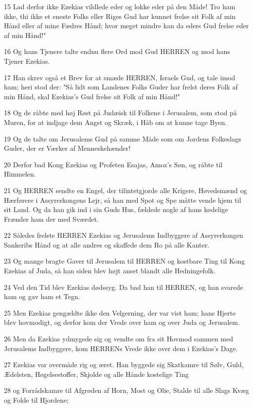\par 15 Lad derfor ikke Ezekias vildlede eder og lokke eder på den Måde! Tro ham ikke, thi ikke et eneste Folks eller Riges Gud har kunnet frelse sit Folk af min Hånd eller af mine Fædres Hånd; hvor meget mindre kan da eders Gud frelse eder af min Hånd!"
\par 16 Og hans Tjenere talte endnu flere Ord mod Gud HERREN og mod hans Tjener Ezekias.
\par 17 Han skrev også et Brev for at smæde HERREN, Israels Gud, og tale imod ham; heri stod der: "Så lidt som Landenes Folks Guder har frelst deres Folk af min Hånd, skal Ezekias's Gud frelse sit Folk af min Hånd!"
\par 18 Og de råbte med høj Røst på Judæisk til Folkene i Jerusalem, som stod på Muren, for at indjage dem Angst og Skræk, i Håb om at kunne tage Byen.
\par 19 Og de talte om Jerusalems Gud på samme Måde som om Jordens Folkeslags Guder, der er Værker af Menneskehænder!
\par 20 Derfor bad Kong Ezekias og Profeten Esajas, Amoz's Søn, og råbte til Himmelen.
\par 21 Og HERREN sendte en Engel, der tilintetgjorde alle Krigere, Høvedsmænd og Hærførere i Assyrerkongens Lejr, så han med Spot og Spe måtte vende hjem til sit Land. Og da han gik ind i sin Guds Hus, fældede nogle af hans kødelige Frænder ham der med Sværdet.
\par 22 Således frelste HERREN Ezekias og Jerusalems Indbyggere af Assyrerkongen Sankeribs Hånd og at alle andres og skaffede dem Ro på alle Kanter.
\par 23 Og mange bragte Gaver til Jerusalem til HERREN og kostbare Ting til Kong Ezekias af Juda, så han siden blev højt anset blandt alle Hedningefolk.
\par 24 Ved den Tid blev Ezekias dødssyg. Da bad han til HERREN, og han svarede ham og gav ham et Tegn.
\par 25 Men Ezekias gengældte ikke den Velgerning, der var vist ham; hans Hjerte blev hovmodigt, og derfor kom der Vrede over ham og over Juda og Jerusalem.
\par 26 Men da Ezekias ydmygede sig og vendte om fra sit Hovmod sammen med Jerusalems Indbyggere, kom HERRENs Vrede ikke over dem i Ezekias's Dage.
\par 27 Ezekias var overmåde rig og æret. Han byggede sig Skatkamre til Sølv, Guld, Ædelsten, Høgelsestoffer, Skjolde og alle Hånde kostelige Ting
\par 28 og Forrådskamre til Afgrøden af Horn, Most og Olie, Stalde til alle Slags Kvæg og Folde til Hjordene;
